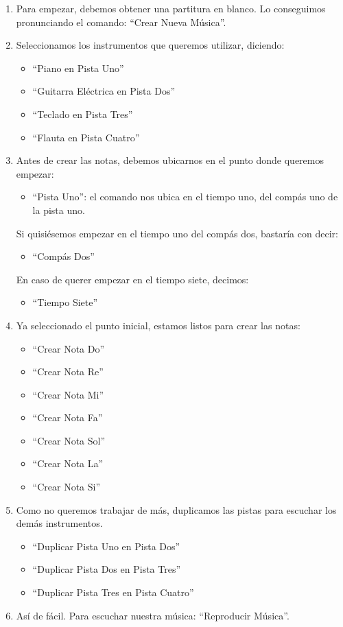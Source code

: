 \begin{enumerate}
\item Para empezar, debemos obtener una partitura en blanco. Lo conseguimos pronunciando el comando: ``Crear Nueva M\'usica''.
\item Seleccionamos los instrumentos que queremos utilizar, diciendo:
\begin{itemize}
    \item ``Piano en Pista Uno''
    \item ``Guitarra El\'ectrica en Pista Dos''
    \item ``Teclado en Pista Tres''
    \item ``Flauta en Pista Cuatro''
\end{itemize}
\item Antes de crear las notas, debemos ubicarnos en el punto donde queremos empezar:
\begin{itemize}
\item ``Pista Uno'': el comando nos ubica en el tiempo uno, del comp\'as uno de la pista uno.
\end{itemize}
    Si quisi\'esemos empezar en el tiempo uno del comp\'as dos, bastar\'ia con decir:
\begin{itemize}
\item ``Comp\'as Dos''
\end{itemize}
    En caso de querer empezar en el tiempo siete, decimos:
\begin{itemize}
\item ``Tiempo Siete''
\end{itemize}
\item Ya seleccionado el punto inicial, estamos listos para crear las notas:
\begin{itemize}
    \item ``Crear Nota Do''
    \item ``Crear Nota Re''
    \item ``Crear Nota Mi''
    \item ``Crear Nota Fa''
    \item ``Crear Nota Sol''
    \item ``Crear Nota La''
    \item ``Crear Nota Si''
\end{itemize}
\item Como no queremos trabajar de m\'as, duplicamos las pistas para escuchar los dem\'as instrumentos.
\begin{itemize}
    \item ``Duplicar Pista Uno en Pista Dos''
    \item  ``Duplicar Pista Dos en Pista Tres''
    \item ``Duplicar Pista Tres en Pista Cuatro''
\end{itemize}
\item As\'i de f\'acil. Para escuchar nuestra m\'usica: ``Reproducir M\'usica''.
\end{enumerate}
 
